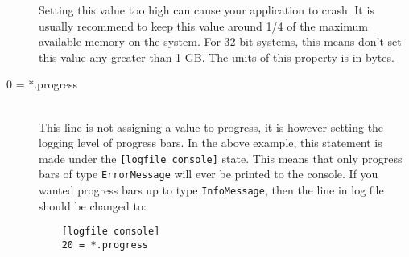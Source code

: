 \begin{description}
Setting this value too high can cause your application to crash. It is
usually recommend to keep this value around 1/4 of the maximum
available memory on the system. For 32 bit systems, this means don't
set this value any greater than 1 GB. The units of this property is in
bytes.

\item[0 = *.progress] \hfill \\
This line is not assigning a value to progress, it is however setting
the logging level of progress bars. In the above example, this
statement is made under the \texttt{[logfile console]} state. This
means that only progress bars of type \texttt{ErrorMessage} will ever
be printed to the console. If you wanted progress bars up to type
\texttt{InfoMessage}, then the line in log file should be changed to:

\begin{verbatim}
    [logfile console]
    20 = *.progress
\end{verbatim}

\end{description}
